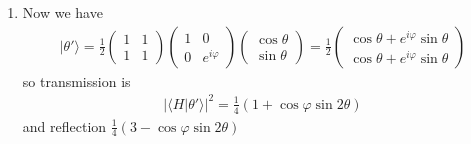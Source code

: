 \documentclass{article}
\begin{document}
\begin{enumerate}
\begin{enumerate}
        \item Now we have
        \begin{align}
        |\theta'\rangle=
        \frac{1}{2}
        \begin{pmatrix}
            1 & 1\\
            1 & 1
            \end{pmatrix}
            \begin{pmatrix}
            1 & 0\\
            0 & e^{i\varphi}
            \end{pmatrix}
            \begin{pmatrix}
            \cos\theta\\
            \sin\theta
            \end{pmatrix}=\frac{1}{2}
            \begin{pmatrix}
            \cos\theta+e^{i\varphi}\sin\theta\\
            \cos\theta+e^{i\varphi}\sin\theta
            \end{pmatrix}
        \end{align} 
    so transmission is
    \begin{align}
        |\langle H|\theta'\rangle|^2=\frac{1}{4}(1+\cos\varphi\sin2\theta)
    \end{align}
    and reflection $\frac{1}{4}(3-\cos\varphi\sin2\theta)$
    \end{enumerate}
\end{enumerate}
\end{document}

